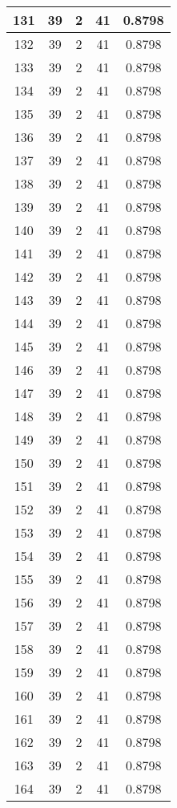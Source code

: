 \documentclass[letterpaper, 12pt]{article}
\begin{document}
\begin{longtable}{|c|c|c|c|c|}
\hline
131 & 39 & 2 & 41 & 0.8798 \\
\hline
132 & 39 & 2 & 41 & 0.8798 \\
\hline
133 & 39 & 2 & 41 & 0.8798 \\
\hline
134 & 39 & 2 & 41 & 0.8798 \\
\hline
135 & 39 & 2 & 41 & 0.8798 \\
\hline
136 & 39 & 2 & 41 & 0.8798 \\
\hline
137 & 39 & 2 & 41 & 0.8798 \\
\hline
138 & 39 & 2 & 41 & 0.8798 \\
\hline
139 & 39 & 2 & 41 & 0.8798 \\
\hline
140 & 39 & 2 & 41 & 0.8798 \\
\hline
141 & 39 & 2 & 41 & 0.8798 \\
\hline
142 & 39 & 2 & 41 & 0.8798 \\
\hline
143 & 39 & 2 & 41 & 0.8798 \\
\hline
144 & 39 & 2 & 41 & 0.8798 \\
\hline
145 & 39 & 2 & 41 & 0.8798 \\
\hline
146 & 39 & 2 & 41 & 0.8798 \\
\hline
147 & 39 & 2 & 41 & 0.8798 \\
\hline
148 & 39 & 2 & 41 & 0.8798 \\
\hline
149 & 39 & 2 & 41 & 0.8798 \\
\hline
150 & 39 & 2 & 41 & 0.8798 \\
\hline
151 & 39 & 2 & 41 & 0.8798 \\
\hline
152 & 39 & 2 & 41 & 0.8798 \\
\hline
153 & 39 & 2 & 41 & 0.8798 \\
\hline
154 & 39 & 2 & 41 & 0.8798 \\
\hline
155 & 39 & 2 & 41 & 0.8798 \\
\hline
156 & 39 & 2 & 41 & 0.8798 \\
\hline
157 & 39 & 2 & 41 & 0.8798 \\
\hline
158 & 39 & 2 & 41 & 0.8798 \\
\hline
159 & 39 & 2 & 41 & 0.8798 \\
\hline
160 & 39 & 2 & 41 & 0.8798 \\
\hline
161 & 39 & 2 & 41 & 0.8798 \\
\hline
162 & 39 & 2 & 41 & 0.8798 \\
\hline
163 & 39 & 2 & 41 & 0.8798 \\
\hline
164 & 39 & 2 & 41 & 0.8798 \\

\end{longtable}
\end{document}
